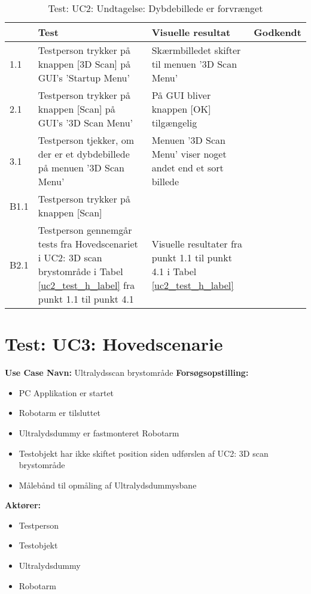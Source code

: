 \begin{table}[htb]
\begin{tabularx}{\textwidth}{|p{0.7cm}|X|X|p{2cm}|}
\hline
\textbf{} & \textbf{Test} & \textbf{Visuelle resultat} &\textbf{Godkendt} \\\hline
1.1 & Testperson trykker på knappen [3D Scan] på GUI's 'Startup Menu' & Skærmbilledet skifter til menuen '3D Scan Menu' &  \\\hline
2.1 & Testperson trykker på knappen [Scan] på GUI's '3D Scan Menu' & På GUI bliver knappen [OK] tilgængelig &  \\\hline
3.1 & Testperson tjekker, om der er et dybdebillede på menuen '3D Scan Menu' & Menuen '3D Scan Menu' viser noget andet end et sort billede & \\\hline
B1.1 & Testperson trykker på knappen [Scan]  \\\hline
B2.1 & Testperson gennemgår tests fra Hovedscenariet i UC2: 3D scan brystområde i Tabel \ref{uc2_test_h_label} fra punkt 1.1 til punkt 4.1  & Visuelle resultater fra punkt 1.1 til punkt 4.1 i Tabel  \ref{uc2_test_h_label} & \\\hline
\end{tabularx}
    \caption{Test: UC2: Undtagelse: Dybdebillede er forvrænget}
    \label{uc2_test_e_2_label}  
\end{table}
\newpage



\section{Test: UC3: Hovedscenarie}
\textbf{Use Case Navn:} Ultralydsscan brystområde \newline
\textbf{Forsøgsopstilling:}
\begin{itemize}
\item PC Applikation er startet
\item Robotarm er tilsluttet
\item Ultralydsdummy er fastmonteret Robotarm
\item Testobjekt har ikke skiftet position siden udførslen af UC2: 3D scan brystområde
\item Målebånd til opmåling af Ultralydsdummysbane 
\end{itemize}  
\textbf{Aktører:}
\begin{itemize}
\item Testperson
\item Testobjekt
\item Ultralydsdummy 
\item Robotarm
\end{itemize}  

